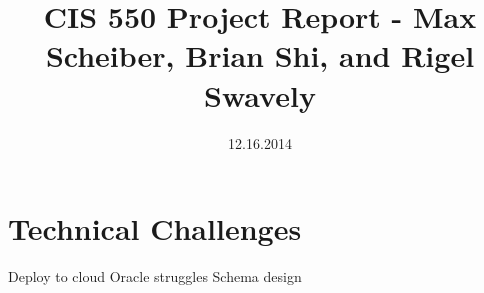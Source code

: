 \documentclass[11pt]{amsart}
\title{CIS 550 Project Report - Max Scheiber, Brian Shi, and Rigel Swavely}
\date{12.16.2014}
\begin{document}
\maketitle
\section{Technical Challenges}


Deploy to cloud
Oracle struggles
Schema design
\end{document}
